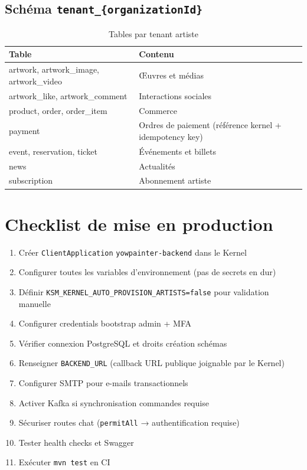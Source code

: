 \subsection{Schéma \texttt{tenant\_\{organizationId\}}}

\begin{table}[h]
  \centering
  \caption{Tables par tenant artiste}
  \label{tab:db-tenant}
  \begin{tabular}{@{}ll@{}}
    \toprule
    \textbf{Table} & \textbf{Contenu} \\
    \midrule
    artwork, artwork\_image, artwork\_video & Œuvres et médias \\
    artwork\_like, artwork\_comment & Interactions sociales \\
    product, order, order\_item & Commerce \\
    payment & Ordres de paiement (référence kernel + idempotency key) \\
    event, reservation, ticket & Événements et billets \\
    news & Actualités \\
    subscription & Abonnement artiste \\
    \bottomrule
  \end{tabular}
\end{table}

\section{Checklist de mise en production}

\begin{enumerate}
  \item Créer \texttt{ClientApplication} \texttt{yowpainter-backend} dans le Kernel
  \item Configurer toutes les variables d'environnement (pas de secrets en dur)
  \item Définir \texttt{KSM\_KERNEL\_AUTO\_PROVISION\_ARTISTS=false} pour validation manuelle
  \item Configurer credentials bootstrap admin + MFA
  \item Vérifier connexion PostgreSQL et droits création schémas
  \item Renseigner \texttt{BACKEND\_URL} (callback URL publique joignable par le Kernel)
  \item Configurer SMTP pour e-mails transactionnels
  \item Activer Kafka si synchronisation commandes requise
  \item Sécuriser routes chat (\texttt{permitAll} → authentification requise)
  \item Tester health checks et Swagger
  \item Exécuter \texttt{mvn test} en CI
\end{enumerate}

